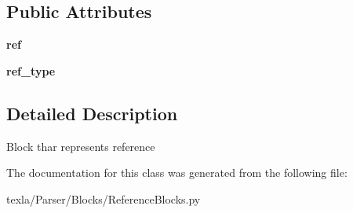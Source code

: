 \subsection*{Public Attributes}
\begin{DoxyCompactItemize}
\item 
\hypertarget{classtexla_1_1Parser_1_1Blocks_1_1ReferenceBlocks_1_1RefBlock_a31d461676ff0abaf7c81b9f997a169b5}{}\label{classtexla_1_1Parser_1_1Blocks_1_1ReferenceBlocks_1_1RefBlock_a31d461676ff0abaf7c81b9f997a169b5} 
{\bfseries ref}
\item 
\hypertarget{classtexla_1_1Parser_1_1Blocks_1_1ReferenceBlocks_1_1RefBlock_a60075d90c8af5e8dda3756af925f1aa4}{}\label{classtexla_1_1Parser_1_1Blocks_1_1ReferenceBlocks_1_1RefBlock_a60075d90c8af5e8dda3756af925f1aa4} 
{\bfseries ref\+\_\+type}
\end{DoxyCompactItemize}


\subsection{Detailed Description}
\begin{DoxyVerb}Block thar represents reference\end{DoxyVerb}
 

The documentation for this class was generated from the following file\+:\begin{DoxyCompactItemize}
\item 
texla/\+Parser/\+Blocks/Reference\+Blocks.\+py\end{DoxyCompactItemize}
